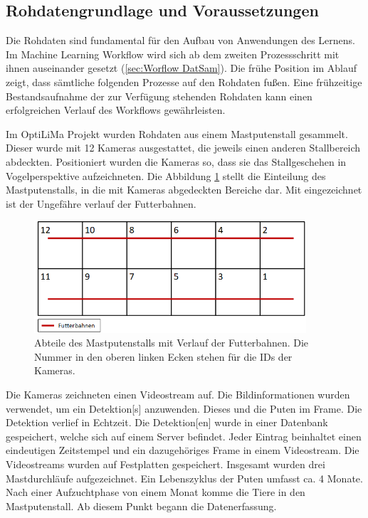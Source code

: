 \subsection{Rohdatengrundlage und Voraussetzungen} \label{sec:Meth RohDat}
Die Rohdaten sind fundamental für den Aufbau von Anwendungen des  Lernens. Im \gls{Machine Learning Workflow} wird sich ab dem zweiten Prozessschritt mit ihnen auseinander gesetzt (\autoref{sec:Worflow DatSam}). Die frühe Position im Ablauf zeigt, dass sämtliche folgenden Prozesse auf den Rohdaten fußen. Eine frühzeitige Bestandsaufnahme der zur Verfügung stehenden Rohdaten kann einen erfolgreichen Verlauf des Workflows gewährleisten. \par

Im \acrshort{OptiLiMa} Projekt wurden Rohdaten aus einem Mastputenstall gesammelt. Dieser wurde mit 12 Kameras ausgestattet, die jeweils einen anderen Stallbereich abdeckten. Positioniert wurden die Kameras so, dass sie das Stallgeschehen in Vogelperspektive aufzeichneten. Die Abbildung \ref{fig:KamerasImStall} stellt die Einteilung des Mastputenstalls, in die mit Kameras abgedeckten Bereiche dar. Mit eingezeichnet ist der Ungefähre verlauf der Futterbahnen.

\begin{figure}[htb]
    \centering
    \includegraphics[width=0.9\textwidth]{img/Grafiken/Stallbereiche mit Futterbahn.png}
    \caption[Abteile des Mastputenstalls mit Verlauf der Futterbahnen.]{Abteile des Mastputenstalls mit Verlauf der Futterbahnen. Die Nummer in den oberen linken Ecken stehen für die IDs der Kameras.}
    \label{fig:KamerasImStall}
\end{figure}

Die Kameras zeichneten einen Videostream auf. Die Bildinformationen wurden verwendet, um ein \gls{Detektion}[s] anzuwenden. Dieses  und  die Puten im \gls{Frame}. Die \gls{Detektion} verlief in Echtzeit. Die \gls{Detektion}[en] wurde in einer Datenbank gespeichert, welche sich auf einem Server befindet. Jeder Eintrag beinhaltet einen eindeutigen Zeitstempel und ein dazugehöriges \gls{Frame} in einem Videostream. Die Videostreams wurden auf Festplatten gespeichert. Insgesamt wurden  drei Mastdurchläufe aufgezeichnet. Ein Lebenszyklus der Puten umfasst ca. 4 Monate. Nach einer Aufzuchtphase von einem Monat komme die Tiere in den Mastputenstall. Ab diesem Punkt begann die Datenerfassung. \par

